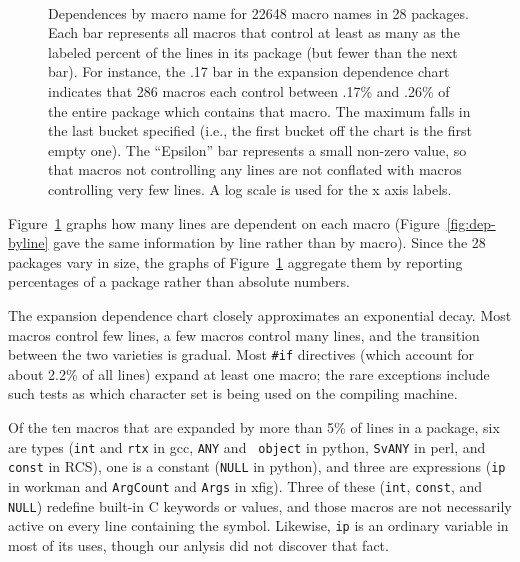 \documentclass[10pt]{article}
\def\numpackageslesstwo{28}
\newcommand{\pkg}[1]{\textsf{#1}}
\newcommand{\captionsmall}[1]{\caption[]{\small #1}}
\begin{document}
\begin{figure}
\centerline{%
~%
}
\captionsmall{Dependences by macro name for 22648 macro names in 28 packages.
  Each bar represents all macros that control at least as many as the
  labeled percent of the lines in its package (but fewer than the next
  bar).  For instance, the .17 bar in the expansion dependence chart
  indicates that 286 macros each control between .17\% and .26\% of the
  entire package which contains that macro.  The maximum falls in the last
  bucket specified (i.e., the first bucket off the chart is the first empty
  one).  The ``Epsilon'' bar represents a small non-zero value, so that
  macros not controlling any lines are not conflated with macros
  controlling very few lines.  A log scale is used for the x axis labels.}

\label{fig:dep-bymacro}
\end{figure}

Figure~\ref{fig:dep-bymacro} graphs how many lines are dependent on each
macro (Figure~\ref{fig:dep-byline} gave the same information by line rather
than by macro).  Since the {\numpackageslesstwo} packages vary in size, the
graphs of Figure~\ref{fig:dep-bymacro} aggregate them by reporting
percentages of a package rather than absolute numbers.


The expansion dependence chart closely approximates an exponential decay.
Most macros control few lines, a few macros control many lines, and the
transition between the two varieties is gradual.  Most {\tt \#if}
directives (which account for about 2.2\% of all lines) expand at least one
macro; the rare exceptions include such tests as which character set is
being used on the compiling machine.

Of the ten macros that are expanded by more than 5\% of lines in a package,
six are types ({\tt int} and {\tt rtx} in \pkg{gcc}, {\tt ANY} and {\tt
object} in \pkg{python}, {\tt SvANY} in \pkg{perl}, and {\tt const} in
RCS), one is a constant ({\tt NULL} in python), and three are expressions
({\tt ip} in \pkg{workman} and {\tt ArgCount} and {\tt Args} in
\pkg{xfig}).  Three of these ({\tt int}, {\tt const}, and {\tt NULL})
redefine built-in C keywords or values, and those macros are not
necessarily active on every line containing the symbol.  Likewise, {\tt ip}
is an ordinary variable in most of its uses, though our anlysis did not
discover that fact.
\end{document}
